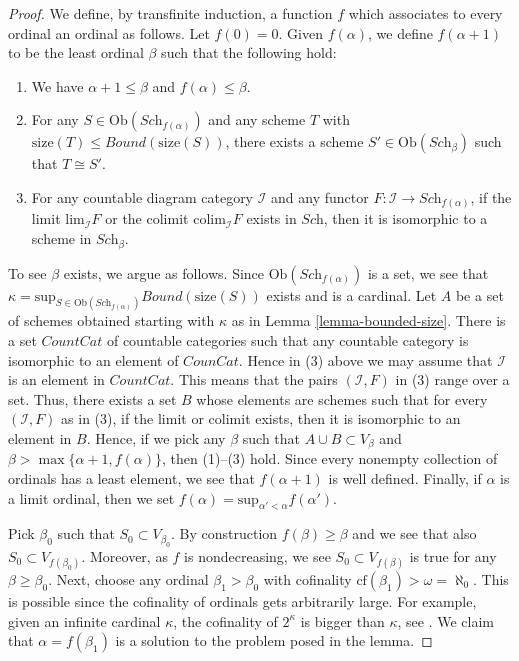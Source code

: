 \begin{proof}
We define, by transfinite induction, a function $f$ which associates
to every ordinal an ordinal as follows. Let $f(0) = 0$.
Given $f(\alpha)$, we define $f(\alpha + 1)$ to be the least
ordinal $\beta$ such that the following hold:
\begin{enumerate}
\item We have $\alpha + 1 \leq \beta$ and $f(\alpha) \leq \beta$.
\item For any $S \in \text{Ob}(\textit{Sch}_{f(\alpha)})$ and any
scheme $T$ with $\text{size}(T) \leq Bound(\text{size}(S))$,
there exists a scheme $S' \in \text{Ob}(\textit{Sch}_\beta)$
such that $T \cong S'$.
\item For any countable diagram category $\mathcal{I}$ and
any functor $F : \mathcal{I} \to \textit{Sch}_{f(\alpha)}$, if
the limit $\text{lim}_\mathcal{I} F$ or the colimit
$\text{colim}_{\mathcal{I}} F$ exists in $\textit{Sch}$,
then it is isomorphic to a scheme in $\textit{Sch}_\beta$.
\end{enumerate}
To see $\beta$ exists, we argue as follows. Since
$\text{Ob}(\textit{Sch}_{f(\alpha)})$ is a set, we see that
$\kappa =
\text{sup}_{S \in \text{Ob}(\textit{Sch}_{f(\alpha)})} Bound(\text{size}(S))$
exists and is a cardinal.
Let $A$ be a set of schemes obtained starting with $\kappa$
as in Lemma \ref{lemma-bounded-size}.
There is a set $CountCat$ of countable
categories such that any countable category is isomorphic to
an element of $CounCat$. Hence in (3) above we may assume
that $\mathcal{I}$ is an element in $CountCat$. This means that
the pairs $(\mathcal{I}, F)$ in (3) range over a set.
Thus, there exists a set $B$ whose elements are schemes
such that for every $(\mathcal{I}, F)$ as in (3), if the
limit or colimit exists, then it is isomorphic to an element in $B$.
Hence, if we pick any $\beta$ such that $A \cup B \subset V_\beta$
and $\beta > \max\{\alpha + 1, f(\alpha)\}$, then (1)--(3) hold.
Since every nonempty collection of ordinals has a least element,
we see that $f(\alpha + 1)$ is well defined. Finally, if $\alpha$
is a limit ordinal, then we set
$f(\alpha) = \text{sup}_{\alpha' < \alpha} f(\alpha')$.

\medskip\noindent
Pick $\beta_0$ such that $S_0 \subset V_{\beta_0}$.
By construction $f(\beta) \geq \beta$ and we see that
also $S_0 \subset V_{f(\beta_0)}$. Moreover, as $f$ is
nondecreasing, we see $S_0 \subset V_{f(\beta)}$ is true for any
$\beta \geq \beta_0$. 
Next, choose any ordinal $\beta_1 > \beta_0$ with cofinality
$\text{cf}(\beta_1) > \omega = \aleph_0$. This is possible
since the cofinality of ordinals gets arbitrarily large. 
For example, given an infinite cardinal $\kappa$,
the cofinality of $2^\kappa$ is bigger than $\kappa$, see
\cite[Chapter I, Corollary 10.41]{Kunen}. 
We claim that
$\alpha = f(\beta_1)$ is a solution to the problem posed in the lemma.


\end{proof}
